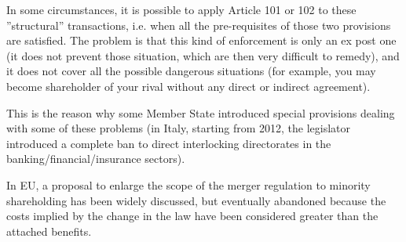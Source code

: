     In some circumstances, it is possible to apply Article 101 or 102 to these ”structural” transactions, i.e. when all the pre-requisites of those two provisions are satisfied. The problem is that this kind of enforcement is only an ex post one (it does not prevent those situation, which are then very difficult to remedy), and it does not cover all the possible dangerous situations (for example, you may become shareholder of your rival without any direct or indirect agreement). 
    
    This is the reason why some Member State introduced special provisions dealing with some of these problems (in Italy, starting from 2012, the legislator introduced a complete ban to direct interlocking directorates in the banking/financial/insurance sectors). 
    
    In EU, a proposal to enlarge the scope of the merger regulation to minority shareholding has been widely discussed, but eventually abandoned because the costs implied by the change in the law have been considered greater than the attached benefits.


